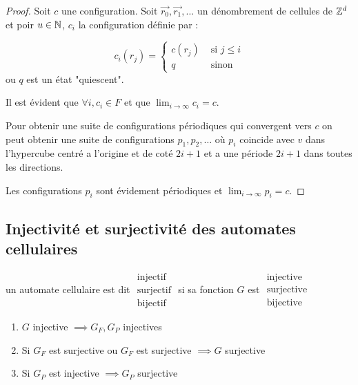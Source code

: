 \begin{proof}
	Soit $c$ une configuration.
	Soit $\vec {r_0}, \vec {r_1},\ldots$ un dénombrement de cellules de $\mathbb{Z}^d$ et poir $u \in \mathbb{N}$,
	$c_i$ la configuration définie par :

	$$ c_i(r_j) = \left\{ \begin{array}{cc}
			c(r_j) & \text{ si } j \leq i \\
			q      & \text{ sinon }
		\end{array}
		\right.$$
	ou $q$ est un état "quiescent".

	Il est évident que $\forall i, c_i \in F$ et que $\lim_{i \to \infty} c_i = c$.

	Pour obtenir une suite de configurations périodiques qui convergent vers $c$ on peut obtenir une suite de configurations
	$p_1, p_2, \ldots $ où $p_i$ coincide avec $v$ dans l'hypercube centré a l'origine et de coté $2i + 1$ et a une
	période $2i + 1$ dans toutes les directions.

	Les configurations $p_i$ sont évidement périodiques et $\lim_{i \to \infty} p_i = c$.
\end{proof}

\subsection{Injectivité et surjectivité des automates cellulaires}

\begin{definition}
	un automate cellulaire est dit
	$\begin{array}{c}
			\text{injectif}  \\
			\text{surjectif} \\
			\text{bijectif}
		\end{array}$
	si sa fonction $G$ est
	$\begin{array}{c}
			\text{injective}  \\
			\text{surjective} \\
			\text{bijective}
		\end{array}$
\end{definition}


\begin{theorem}
	\begin{enumerate}
		\item $G$ injective $\implies G_F, G_P$ injectives \label{thm:big1}
		\item Si $G_F$ est surjective ou $G_F$ est surjective $\implies G$ surjective \label{thm:big2}
		\item Si $G_P$ est injective $\implies G_P$ surjective \label{thm:big3}
	\end{enumerate}
\end{theorem}


